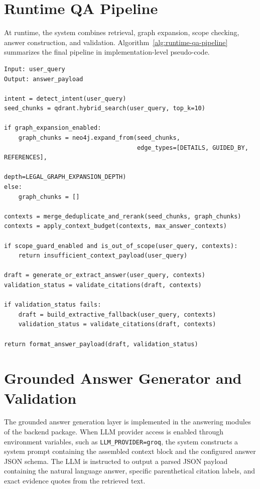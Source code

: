 \section{Runtime QA Pipeline}
At runtime, the system combines retrieval, graph expansion, scope checking, answer construction, and validation. Algorithm~\ref{alg:runtime-qa-pipeline} summarizes the final pipeline in implementation-level pseudo-code.

\begin{lstlisting}[caption={Runtime QA pipeline pseudo-code.},label={alg:runtime-qa-pipeline}]
Input: user_query
Output: answer_payload

intent = detect_intent(user_query)
seed_chunks = qdrant.hybrid_search(user_query, top_k=10)

if graph_expansion_enabled:
    graph_chunks = neo4j.expand_from(seed_chunks,
                                     edge_types=[DETAILS, GUIDED_BY, REFERENCES],
                                     depth=LEGAL_GRAPH_EXPANSION_DEPTH)
else:
    graph_chunks = []

contexts = merge_deduplicate_and_rerank(seed_chunks, graph_chunks)
contexts = apply_context_budget(contexts, max_answer_contexts)

if scope_guard_enabled and is_out_of_scope(user_query, contexts):
    return insufficient_context_payload(user_query)

draft = generate_or_extract_answer(user_query, contexts)
validation_status = validate_citations(draft, contexts)

if validation_status fails:
    draft = build_extractive_fallback(user_query, contexts)
    validation_status = validate_citations(draft, contexts)

return format_answer_payload(draft, validation_status)
\end{lstlisting}

\section{Grounded Answer Generator and Validation}
The grounded answer generation layer is implemented in the answering modules of the backend package. When LLM provider access is enabled through environment variables, such as \texttt{LLM\_PROVIDER=groq}, the system constructs a system prompt containing the assembled context block and the configured answer JSON schema. The LLM is instructed to output a parsed JSON payload containing the natural language answer, specific parenthetical citation labels, and exact evidence quotes from the retrieved text.

